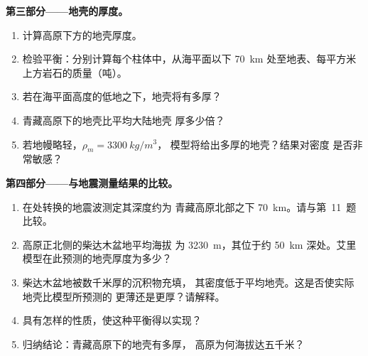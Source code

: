 \begin{problem}
\medskip
\noindent\textbf{第三部分——地壳的厚度。}
\begin{enumerate}[resume]
  \item 计算高原下方的地壳厚度。
  \item 检验平衡：分别计算每个柱体中，从海平面以下
        \qty{70}{km} 处至地表、每平方米上方岩石的质量（吨）。
  \item 若在海平面高度的低地之下，地壳将有多厚？
  \item 青藏高原下的地壳比平均大陆地壳
        厚多少倍？
  \item 若地幔略轻，$\rho_m = \qty{3300}{kg/m^3}$，
        模型将给出多厚的地壳？结果对密度
        是否非常敏感？
\end{enumerate}

\medskip
\noindent\textbf{第四部分——与地震测量结果的比较。}
\begin{enumerate}[resume]
  \item 在处转换的地震波测定其深度约为
        青藏高原北部之下 \qty{70}{km}。请与第~11~题比较。
  \item 高原正北侧的柴达木盆地平均海拔
        为 \qty{3230}{m}，其位于约 \qty{50}{km}
        深处。艾里模型在此预测的地壳厚度为多少？
  \item 柴达木盆地被数千米厚的沉积物充填，
        其密度低于平均地壳。这是否使实际地壳比模型所预测的
        更薄还是更厚？请解释。
  \item {}具有怎样的性质，使这种平衡得以实现？
  \item 归纳结论：青藏高原下的地壳有多厚，
        高原为何海拔达五千米？
\end{enumerate}
\end{problem}
